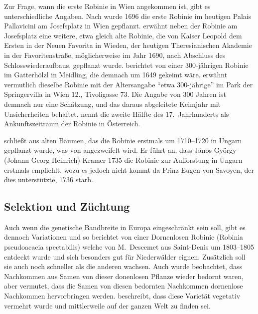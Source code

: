 \documentclass[twocolumn]{scrartcl}
\begin{document}
Zur Frage, wann die erste Robinie in Wien angekommen ist, gibt es
unterschiedliche Angaben. Nach \citet[S.~147]{loudon1838arboretum1}
wurde 1696 die erste Robinie im heutigen Palais Pallavicini am
Josefsplatz in Wien
gepflanzt. \citet[S.~15--16]{jacquin1825univGarten} erwähnt neben der
Robinie am Josefsplatz eine weitere, etwa gleich alte Robinie, die von
Kaiser Leopold dem Ersten in der Neuen Favorita in Wieden, der
heutigen Theresianischen Akademie in der Favoritenstraße,
möglicherweise im Jahr 1690, nach Abschluss des Schlosswiederaufbaus,
gepflanzt wurde. \citet{jagr1949robinie} berichtet von einer
300-jährigen Robinie im Gatterhölzl in Meidling, die demnach um 1649
gekeimt wäre. \citet{anonymNatLand1949robinie} erwähnt vermutlich
dieselbe Robinie mit der Altersangabe \enquote{etwa 300-jährige} im
Park der Springervilla in Wien 12., Tivoligasse 73. Die Angabe von 300
Jahren ist demnach nur eine Schätzung, und das daraus abgeleitete
Keimjahr mit Unsicherheiten behaftet. \citet[S.~1395]{hegi1924band43}
nennt die zweite Hälfte des 17.~Jahrhunderts als Ankunftszeitraum der
Robinie in Österreich.

\citet[S.~3]{vadas1911robinie} schließt aus alten Bäumen, das
die Robinie erstmals um 1710--1720 in Ungarn gepflanzt wurde, was von
\citet[S.~179]{ernyey1926robinie} angezweifelt wird. Er führt an, dass
János György (Johann Georg Heinrich) Kramer 1735 die Robinie zur
Aufforstung in Ungarn erstmals empfiehlt, wozu es jedoch nicht kommt da
Prinz Eugen von Savoyen, der dies unterstützte, 1736 starb.

\subsection{Selektion und Züchtung}

Auch wenn die genetische Bandbreite in Europa eingeschränkt sein soll, gibt es
dennoch Variationen und so berichtet \citet[S.~259--260]{Michaux1813arbres} von
einer Dornenlosen Robinie (Robinia pseudoacacia spectabilis) welche von
M.~Descemet aus Saint-Denis um 1803--1805 entdeckt wurde und sich besonders gut
für Niederwälder eignen. Zusätzlich soll sie auch noch schneller als die anderen
wachsen. Auch wurde beobachtet, dass Nachkommen aus Samen von dieser donenlosen
Pflanze wieder bedornt waren, aber \citet{Michaux1813arbres} vermutet, dass die
Samen von diesen bedornten Nachkommen dornenlose Nachkommen hervorbringen
werden. \citet[S.~173]{quatrefages1861robinie} beschreibt, dass diese Varietät
vegetativ vermehrt wurde und mittlerweile auf der ganzen Welt zu finden sei.
\end{document}
